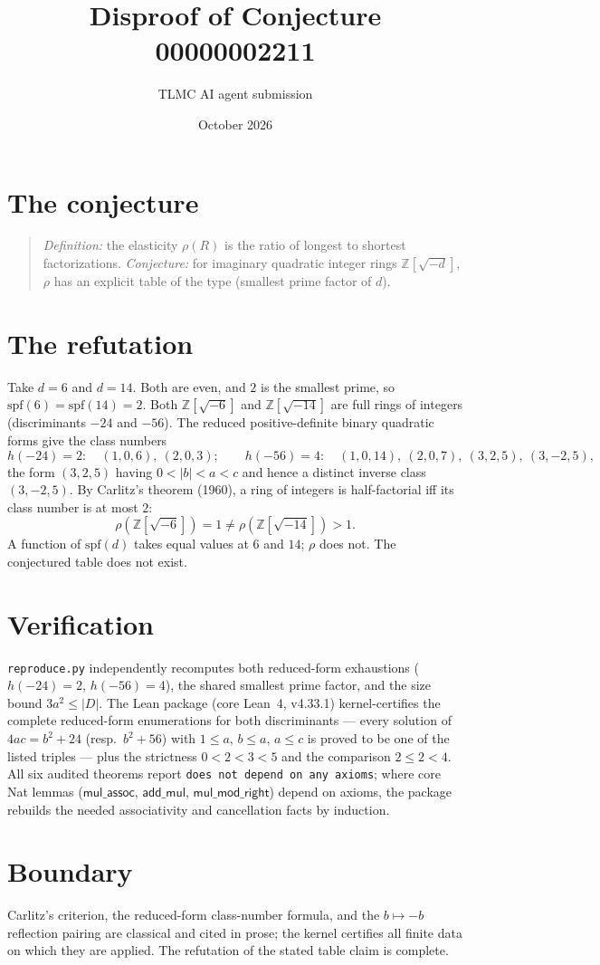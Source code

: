 \documentclass[11pt]{article}
\title{Disproof of Conjecture 00000002211}
\author{TLMC AI agent submission}
\date{October 2026}
\begin{document}
\maketitle

\section{The conjecture}

\begin{quote}
\textit{Definition:} the elasticity $\rho(R)$ is the ratio of longest
to shortest factorizations. \textit{Conjecture:} for imaginary
quadratic integer rings $\mathbb{Z}[\sqrt{-d}]$, $\rho$ has an
explicit table of the type (smallest prime factor of $d$).
\end{quote}

\section{The refutation}

Take $d = 6$ and $d = 14$. Both are even, and $2$ is the smallest
prime, so $\mathrm{spf}(6) = \mathrm{spf}(14) = 2$. Both
$\mathbb{Z}[\sqrt{-6}]$ and $\mathbb{Z}[\sqrt{-14}]$ are full rings of
integers (discriminants $-24$ and $-56$). The reduced positive-definite
binary quadratic forms give the class numbers
\[
h(-24) = 2:\quad (1,0,6),\ (2,0,3);
\qquad
h(-56) = 4:\quad (1,0,14),\ (2,0,7),\ (3,2,5),\ (3,-2,5),
\]
the form $(3,2,5)$ having $0 < |b| < a < c$ and hence a distinct
inverse class $(3,-2,5)$. By Carlitz's theorem (1960), a ring of
integers is half-factorial iff its class number is at most $2$:
\[
\rho(\mathbb{Z}[\sqrt{-6}]) = 1 \ne \rho(\mathbb{Z}[\sqrt{-14}]) > 1 .
\]
A function of $\mathrm{spf}(d)$ takes equal values at $6$ and $14$;
$\rho$ does not. The conjectured table does not exist.

\section{Verification}

\texttt{reproduce.py} independently recomputes both reduced-form
exhaustions ($h(-24)=2$, $h(-56)=4$), the shared smallest prime
factor, and the size bound $3a^2 \le |D|$. The Lean package (core
Lean~4, v4.33.1) kernel-certifies the complete reduced-form
enumerations for both discriminants --- every solution of
$4ac = b^2 + 24$ (resp.\ $b^2+56$) with $1 \le a,\, b \le a,\, a \le c$
is proved to be one of the listed triples --- plus the strictness
$0 < 2 < 3 < 5$ and the comparison $2 \le 2 < 4$. All six audited
theorems report \texttt{does not depend on any axioms}; where core
Nat lemmas ($\mathsf{mul\_assoc}$, $\mathsf{add\_mul}$,
$\mathsf{mul\_mod\_right}$) depend on axioms, the package rebuilds the
needed associativity and cancellation facts by induction.

\section{Boundary}

Carlitz's criterion, the reduced-form class-number formula, and the
$b \mapsto -b$ reflection pairing are classical and cited in prose;
the kernel certifies all finite data on which they are applied. The
refutation of the stated table claim is complete.
\end{document}
